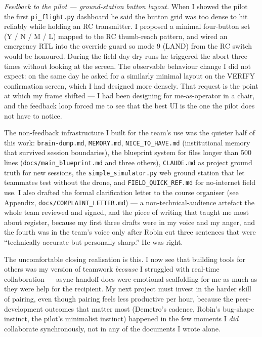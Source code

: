 \textit{Feedback to the pilot --- ground-station button layout.} When I showed the pilot the first \texttt{pi\_flight.py} dashboard he said the button grid was too dense to hit reliably while holding an RC transmitter. I proposed a minimal four-button set (Y / N / M / L) mapped to the RC thumb-reach pattern, and wired an emergency RTL into the override guard so mode 9 (LAND) from the RC switch would be honoured. During the field-day dry runs he triggered the abort three times without looking at the screen. The observable behaviour change I did not expect: on the same day he asked for a similarly minimal layout on the VERIFY confirmation screen, which I had designed more densely. That request is the point at which my frame shifted --- I had been designing for me-as-operator in a chair, and the feedback loop forced me to see that the best UI is the one the pilot does not have to notice.

The non-feedback infrastructure I built for the team's use was the quieter half of this work: \texttt{brain-dump.md}, \texttt{MEMORY.md}, \texttt{NICE\_TO\_HAVE.md} (institutional memory that survived session boundaries), the blueprint system for files longer than 500 lines (\texttt{docs/main\_blueprint.md} and three others), \texttt{CLAUDE.md} as project ground truth for new sessions, the \texttt{simple\_simulator.py} web ground station that let teammates test without the drone, and \texttt{FIELD\_QUICK\_REF.md} for no-internet field use. I also drafted the formal clarification letter to the course organiser (see Appendix, \texttt{docs/COMPLAINT\_LETTER.md}) --- a non-technical-audience artefact the whole team reviewed and signed, and the piece of writing that taught me most about register, because my first three drafts were in my voice and my anger, and the fourth was in the team's voice only after Robin cut three sentences that were ``technically accurate but personally sharp.'' He was right.

The uncomfortable closing realisation is this. I now see that building tools for others was my version of teamwork \emph{because} I struggled with real-time collaboration --- async handoff docs were emotional scaffolding for me as much as they were help for the recipient. My next project must invest in the harder skill of pairing, even though pairing feels less productive per hour, because the peer-development outcomes that matter most (Demetro's cadence, Robin's bug-shape instinct, the pilot's minimalist instinct) happened in the few moments I \emph{did} collaborate synchronously, not in any of the documents I wrote alone.
